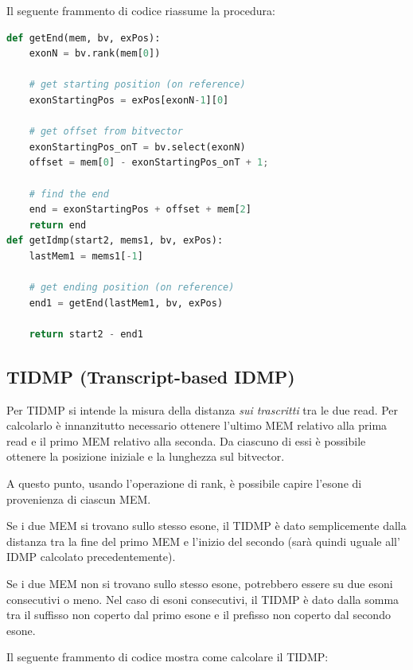 Il seguente frammento di codice riassume la procedura:

\begin{lstlisting}[language=Python]
def getEnd(mem, bv, exPos):
    exonN = bv.rank(mem[0])

    # get starting position (on reference)
    exonStartingPos = exPos[exonN-1][0]

    # get offset from bitvector
    exonStartingPos_onT = bv.select(exonN)
    offset = mem[0] - exonStartingPos_onT + 1;

    # find the end
    end = exonStartingPos + offset + mem[2]
    return end
def getIdmp(start2, mems1, bv, exPos):
    lastMem1 = mems1[-1]

    # get ending position (on reference)
    end1 = getEnd(lastMem1, bv, exPos)

    return start2 - end1
\end{lstlisting}


\newpage

\subsection{TIDMP (Transcript-based IDMP)}
Per TIDMP si intende la misura della distanza \textit{sui trascritti} tra le due read. Per calcolarlo è innanzitutto necessario ottenere l'ultimo MEM relativo alla prima read e il primo MEM relativo alla seconda. Da ciascuno di essi è possibile ottenere la posizione iniziale e la lunghezza sul bitvector. 

A questo punto, usando l'operazione di rank, è possibile capire l'esone di provenienza di ciascun MEM.

Se i due MEM si trovano sullo stesso esone, il TIDMP è dato semplicemente dalla distanza tra la fine del primo MEM e l'inizio del secondo (sarà quindi uguale all' IDMP calcolato precedentemente).

Se i due MEM non si trovano sullo stesso esone, potrebbero essere su due esoni consecutivi o meno. Nel caso di esoni consecutivi, il TIDMP è dato dalla somma tra il suffisso non coperto dal primo esone e il prefisso non coperto dal secondo esone.

Il seguente frammento di codice mostra come calcolare il TIDMP:

